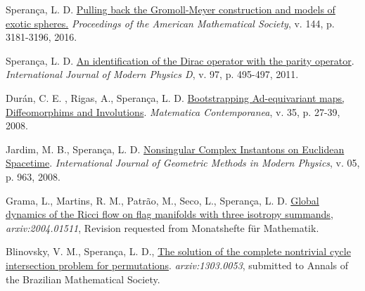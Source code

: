 \documentclass[10pt]{article}
\newenvironment{innerlist}[1][\enskip\textbullet]%
{\begin{compactitem}[#1]}{\end{compactitem}}
\begin{document}
\begin{enumerate}[$\star$]
\begin{innerlist}[-]
		
		
		
		
		
		\item Sperança, L. D. \href{https://www.ams.org/journals/proc/2016-144-07/S0002-9939-2015-12945-0/home.html}{Pulling back the Gromoll-Meyer construction and models of exotic spheres.} {\textit{Proceedings of the American Mathematical Society}, v. 144, p. 3181-3196, 2016}.
		
		
		
				\item Sperança, L. D. \href{https://www.worldscientific.com/doi/10.1142/S0218271814440039}{An identification of the Dirac operator with the parity operator}. { \textit{International Journal of Modern Physics D},  v. 97, p. 495-497, 2011}.
		    \vspace{.1 in}
		
		
		
	
		
				\item Durán, C. E. , Rigas, A., Sperança, L. D.  \href{https://www.mat.unb.br/~matcont/35_2.pdf}{Bootstrapping Ad-equivariant maps, Diffeomorphims and Involutions}. {\textit{Matematica Contemporanea},  v. 35, p. 27-39, 2008}.
		    \vspace{.1 in}
		
				\item Jardim, M. B., Sperança, L. D. \href{https://www.worldscientific.com/doi/10.1142/S0219887808003132}{Nonsingular Complex Instantons on Euclidean Spacetime}. {\textit{International Journal of Geometric Methods in Modern Physics}, v. 05, p. 963, 2008}.
		
		

\item Grama, L., Martins, R. M., Patrão, M., Seco, L., Sperança, L. D.
\href{https://arxiv.org/abs/2004.01511}{Global dynamics of the Ricci flow on flag manifolds with three isotropy summands}, \textit{{arxiv:2004.01511}}, Revision requested from  Monatshefte f\"ur Mathematik.





\item Blinovsky, V. M., Sperança, L. D., \href{https://arxiv.org/abs/1303.0053}{The solution of the complete nontrivial cycle intersection problem for permutations}. 
\textit{{arxiv:1303.0053}}, submitted to Annals of the Brazilian Mathematical Society.



\end{innerlist}
\end{enumerate}
\end{document}

